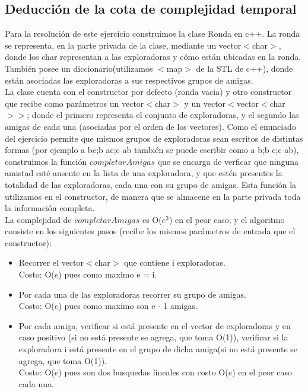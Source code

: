 \subsection{Deducción de la cota de complejidad temporal}

Para la resolución de este ejercicio construimos la clase Ronda en c++. La ronda se representa, en la parte privada de la clase,
mediante un vector$<$char$>$, donde los char representan a las exploradoras y cómo están ubicadas en la ronda. También posee un 
diccionario(utilizamos $<$map$>$ de la STL de c++), donde están asociadas las exploradoras a sus respectivos grupos de amigas. \\
La clase cuenta con el constructor por defecto (ronda vacia) y otro constructor que recibe como parámetros un vector$<$char$>$ y un
vector$<$vector$<$char$>>$; donde el primero representa el conjunto de exploradoras, y el segundo las amigas de cada una (asociadas
por el orden de los vectores). Como el enunciado del ejercicio permite que mismos grupos de exploradoras sean escritos de distintas 
formas (por ejemplo a bc;b ac;c ab también se puede escribir como a b;b c;c ab), construimos la función $completarAmigas$ que se 
encarga de verficar que ninguna amistad esté ausente en la lista de una exploradora, y que estén presentes la totalidad de las 
exploradoras, cada una con su grupo de amigas. Esta función la utilizamos en el constructor, de manera que se almacene en la parte 
privada toda la información completa. \\
La complejidad de $completarAmigas$ es O($e^3$) en el peor caso; y el algoritmo consiste en los siguientes pasos (recibe los mismos 
parámetros de entrada que el constructor): \\
\begin{itemize}
\item Recorrer el vector$<$char$>$ que contiene i exploradoras. \\
Costo: O($e$) pues como maximo  e = i. 
\item Por cada una de las exploradoras recorrer su grupo de amigas. \\
Costo: O($e$) pues como maximo son e - 1 amigas.
\item Por cada amiga, verificar si está presente en el vector de exploradoras y en caso positivo (si no está presente se agrega, que 
toma O(1)), verificar si la exploradora i está presente en el grupo de dicha amiga(si no está presente se agrega, que 
toma O(1)).  \\
Costo: O($e$) pues son dos busquedas lineales con costo O($e$) en el peor caso cada una.
\end{itemize}
